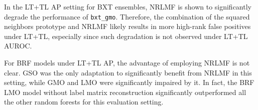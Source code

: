 In the LT+TL AP setting for BXT ensembles, NRLMF is shown to significantly degrade the performance of \texttt{bxt\_gmo}. Therefore, the combination of the squared neighbors prototype and NRLMF likely results in more high-rank false positives under LT+TL, especially since such degradation is not observed under LT+TL AUROC.  %
%



%

For BRF models under LT+TL AP, the advantage of employing NRLMF is not clear. GSO was the only adaptation to significantly benefit from NRLMF in this setting, while GMO and LMO were significantly impaired by it. In fact, the BRF LMO model without label matrix reconstruction significantly outperformed all the other random forests for this evaluation setting.


